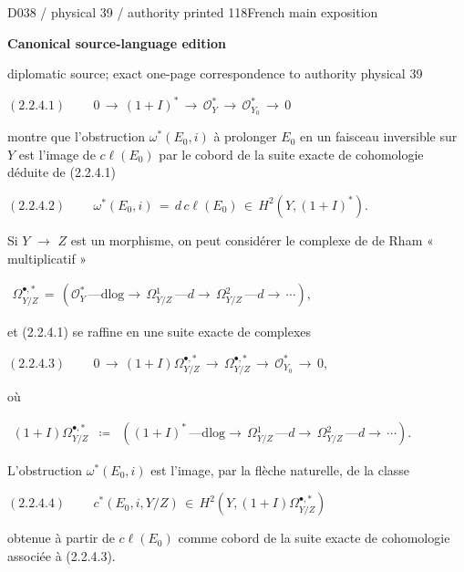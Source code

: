 \documentclass[9pt]{article}
\newcommand{\CanonText}[1]{\par{\fontsize{8.0}{9.35}\selectfont\RaggedRight #1\par}\vspace{2.2pt}}
\newcommand{\CanonDisplay}[1]{\par\vspace{1.2pt}\begin{center}{\fontsize{7.2}{8.4}\selectfont\(\displaystyle #1\)}\end{center}\vspace{1.2pt}}
\newenvironment{CanonMathBlock}{\par\vspace{1.2pt}\begin{center}\fontsize{6.8}{8.0}\selectfont\(\displaystyle}{\)\end{center}\vspace{1.2pt}}
\newcommand{\LayerTitle}{Canonical source-language edition}
\begin{document}
\noindent\begin{minipage}[t][\dimexpr\textheight-5pt\relax][t]{\textwidth}
{\sffamily\fontsize{7.3}{8.2}\selectfont\color{Quiet} D038 / physical 39 / authority printed 118\hfill French main exposition}
\par{}\vspace{4.5pt}
{\sffamily\fontsize{10.4}{11.6}\selectfont\bfseries\color{Accent} \LayerTitle}
\par{\sffamily\fontsize{6.7}{7.7}\selectfont\color{Quiet} diplomatic source; exact one-page correspondence to authority physical 39}
\vspace{5pt}
\CanonDisplay{(2.2.4.1)\qquad\,0\,\to{}\,(1+I)^{*}\,\to{}\,\mathcal{O}_{Y}^{*}\,\to{}\,\mathcal{O}_{Y_{0}}^{*}\,\to{}\,0}
\CanonText{montre que l'obstruction \(\omega{}^{*}(E_{0},i)\) à prolonger \(E_{0}\) en un faisceau inversible sur \(Y\) est l'image de \(c\ell{}(E_{0})\) par le cobord de la suite exacte de cohomologie déduite de (2.2.4.1)}
\CanonDisplay{(2.2.4.2)\qquad\,\omega{}^{*}(E_{0},i)\,=\,d\,c\ell{}(E_{0})\,\in{}\,H^{2}(Y,(1+I)^{*}).}
\CanonText{Si \(Y\) \(\to{}\) \(Z\) est un morphisme, on peut considérer le complexe de de Rham « multiplicatif »}
\begin{CanonMathBlock}
\begin{array}{c}
\Omega{}^{\bullet{},*}_{Y/Z}\,=\,(\mathcal{O}_{Y}^{*}\,\text{---}\text{dlog}\to{}\,\Omega{}^{1}_{Y/Z}\,\text{---}d\to{}\,\Omega{}^{2}_{Y/Z}\,\text{---}d\to{}\,\cdots{}),
\end{array}
\end{CanonMathBlock}
\CanonText{et (2.2.4.1) se raffine en une suite exacte de complexes}
\CanonDisplay{(2.2.4.3)\qquad\,0\,\to{}\,(1+I)\Omega{}^{\bullet{},*}_{Y/Z}\,\to{}\,\Omega{}^{\bullet{},*}_{Y/Z}\,\to{}\,\mathcal{O}_{Y_{0}}^{*}\,\to{}\,0,}
\CanonText{où}
\begin{CanonMathBlock}
\begin{array}{ccc}
(1+I)\Omega{}^{\bullet{},*}_{Y/Z} & \coloneqq{} & ((1+I)^{*}\,\text{---}\text{dlog}\to{}\,\Omega{}^{1}_{Y/Z}\,\text{---}d\to{}\,\Omega{}^{2}_{Y/Z}\,\text{---}d\to{}\,\cdots{}).
\end{array}
\end{CanonMathBlock}
\CanonText{L'obstruction \(\omega{}^{*}(E_{0},i)\) est l'image, par la flèche naturelle, de la classe}
\CanonDisplay{(2.2.4.4)\qquad\,c^{*}(E_{0},i,Y/Z)\,\in{}\,H^{2}(Y,(1+I)\Omega{}^{\bullet{},*}_{Y/Z})}
\CanonText{obtenue à partir de \(c\ell{}(E_{0})\) comme cobord de la suite exacte de cohomologie associée à (2.2.4.3).}

\end{minipage}
\end{document}
